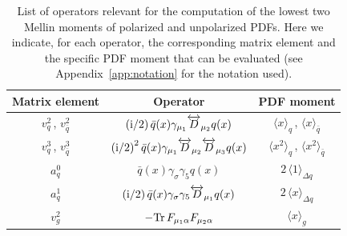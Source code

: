 \begin{table}
\renewcommand{\arraystretch}{1.6} 
\centering
\begin{tabular}{@{}ccc@{}}
\hline 
Matrix element & Operator & PDF moment \\ 
\hline
$v_q^2$\,, $v_{\bar{q}}^2$  & $\displaystyle \left({\rm i}/2\right) \bar{q}(x)\gamma_{\mu_1} \overleftrightarrow{D}_{\mu_2} q(x)$ & $\langle x \rangle_q$\,, $\langle x \rangle_{\bar{q}}$   \\
$v_q^3$\,, $v_{\bar{q}}^3$  & $\displaystyle \left({\rm i}/2\right)^2 \bar{q}(x)\gamma_{\mu_1} \overleftrightarrow{D}_{\mu_2} \overleftrightarrow{D}_{\mu_3} q(x)$ & $\langle x^2 \rangle_q$\,, $\langle x^2 \rangle_{\bar{q}}$ \\
$a_q^0$ & $\displaystyle \bar{q}(x)\gamma_{\sigma} \gamma_5 q(x)$ & $2\, \langle 1 \rangle_{\Delta q}$ \\
$a_q^1$ & $\displaystyle \left({\rm i}/2\right) \bar{q}(x)\gamma_{\sigma} \gamma_5 \overleftrightarrow{D}_{\mu_1} q(x)$ & $2\, \langle x \rangle_{\Delta q}$ \\
$v_g^2$ & $\displaystyle - {\rm Tr}\, F_{\mu_1\alpha}F_{\mu_2\alpha}$ & $\langle x \rangle_g$ \\
\hline
\end{tabular}
\caption{\label{Tab:twist2}
\small List of operators relevant for
the computation of the lowest two Mellin moments of polarized and unpolarized PDFs.
%
Here we indicate, for each operator, the corresponding matrix element and
the specific PDF moment that can be evaluated (see
Appendix~\ref{app:notation} for the notation used).
}
\end{table}

